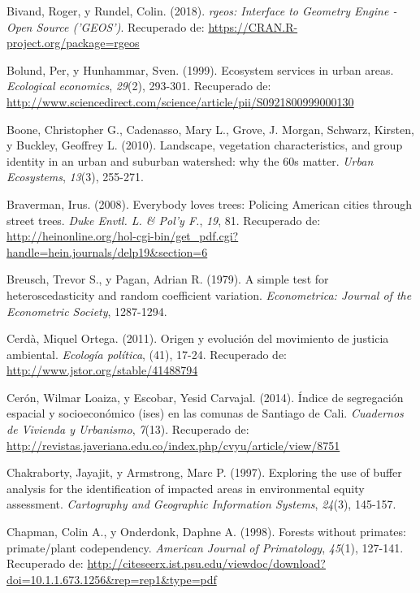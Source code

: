 \documentclass[12pt,a4paper,openany]{book}
\theoremstyle{definition}
\theoremstyle{definition}
\theoremstyle{definition}
\theoremstyle{remark}
\begin{document}
\hypertarget{ref-R-rgeos}{}
Bivand, Roger, y Rundel, Colin. (2018). \emph{rgeos: Interface to
Geometry Engine - Open Source ('GEOS')}. Recuperado de:
\url{https://CRAN.R-project.org/package=rgeos}

\hypertarget{ref-bolund_ecosystem_1999}{}
Bolund, Per, y Hunhammar, Sven. (1999). Ecosystem services in urban
areas. \emph{Ecological economics}, \emph{29}(2), 293-301. Recuperado
de:
\url{http://www.sciencedirect.com/science/article/pii/S0921800999000130}

\hypertarget{ref-boone2010landscape}{}
Boone, Christopher G., Cadenasso, Mary L., Grove, J. Morgan, Schwarz,
Kirsten, y Buckley, Geoffrey L. (2010). Landscape, vegetation
characteristics, and group identity in an urban and suburban watershed:
why the 60s matter. \emph{Urban Ecosystems}, \emph{13}(3), 255-271.

\hypertarget{ref-braverman_everybody_2008}{}
Braverman, Irus. (2008). Everybody loves trees: Policing American cities
through street trees. \emph{Duke Envtl. L. \& Pol'y F.}, \emph{19}, 81.
Recuperado de:
\url{http://heinonline.org/hol-cgi-bin/get_pdf.cgi?handle=hein.journals/delp19\&section=6}

\hypertarget{ref-breusch1979simple}{}
Breusch, Trevor S., y Pagan, Adrian R. (1979). A simple test for
heteroscedasticity and random coefficient variation. \emph{Econometrica:
Journal of the Econometric Society}, 1287-1294.

\hypertarget{ref-cerda_origen_2011}{}
Cerdà, Miquel Ortega. (2011). Origen y evolución del movimiento de
justicia ambiental. \emph{Ecología política}, (41), 17-24. Recuperado
de: \url{http://www.jstor.org/stable/41488794}

\hypertarget{ref-ceron_indice_2014}{}
Cerón, Wilmar Loaiza, y Escobar, Yesid Carvajal. (2014). Índice de
segregación espacial y socioeconómico (ises) en las comunas de Santiago
de Cali. \emph{Cuadernos de Vivienda y Urbanismo}, \emph{7}(13).
Recuperado de:
\url{http://revistas.javeriana.edu.co/index.php/cvyu/article/view/8751}

\hypertarget{ref-chakraborty1997exploring}{}
Chakraborty, Jayajit, y Armstrong, Marc P. (1997). Exploring the use of
buffer analysis for the identification of impacted areas in
environmental equity assessment. \emph{Cartography and Geographic
Information Systems}, \emph{24}(3), 145-157.

\hypertarget{ref-chapman_forests_1998}{}
Chapman, Colin A., y Onderdonk, Daphne A. (1998). Forests without
primates: primate/plant codependency. \emph{American Journal of
Primatology}, \emph{45}(1), 127-141. Recuperado de:
\url{http://citeseerx.ist.psu.edu/viewdoc/download?doi=10.1.1.673.1256\&rep=rep1\&type=pdf}
\end{document}
